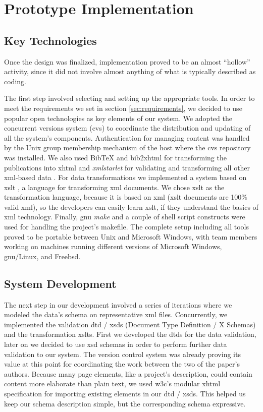 \documentclass{article}
\begin{document}
\section{Prototype Implementation}

\subsection{Key Technologies}
\label{subsec:key-tech}

Once the design was finalized,
implementation proved to be an almost ``hollow'' activity,
since it did not involve almost anything of what
is typically described as coding.

The first step involved selecting and setting up the
appropriate tools. In order to meet the requirements we set in section \ref{sec:requirements}, 
we decided to use popular open
technologies as key elements of our system.
We adopted the concurrent versions system
({\sc cvs}) \cite{BF01} to coordinate the distribution
and updating of all the system's components.
Authentication for managing content was handled by the
Unix group membership mechanism of the host where the
{\sc cvs} repository was installed.
We also used
{\sc BibTeX} \cite{Pa88,Lam94} and {\sc bib2xhtml} \cite{BibXHMTL} for transforming the publications
into {\sc xhtml} and
\textit{xmlstarlet} \cite{Gru04} for validating and transforming
all other {\sc xml}-based data \cite{W3C_XML}.
For data transformations we 
implemented a system based on {\sc xslt} \cite{W3C_XSLT}, a language for transforming {\sc xml} documents.
We chose {\sc xslt} as the transformation language, because it is based on {\sc xml} ({\sc xslt} documents are 100\% valid {\sc xml}), so the
developers can easily learn {\sc xslt}, if they understand the basics of {\sc xml} technology.
Finally, {\sc gnu} {\em make} \cite{gnu_make} and a couple of shell script
constructs were used for handling the project's makefile.
The complete setup including all tools proved to be portable
between Unix and Microsoft Windows, with team members working
on machines running different versions of Microsoft Windows, {\sc gnu}/Linux,
and Free{\sc bsd}.

\subsection{System Development}

The next step in our development involved a series of iterations where we
modeled the data's schema on representative {\sc xml}
files. Concurrently, we implemented the validation {\sc dtd / xsd}s (Document Type Definition / X Schemas)
and the transformation {\sc xslt}s. First we developed the {\sc dtd}s
for the data validation, later on we decided to use {\sc xsd} schemas in order to perform
further data validation to our system.
The version control system was already proving its value
at this point
for coordinating the work between the two of the paper's authors.
Because many page elements, like a project's description,
could contain content more elaborate than plain text,
we used {\sc w3c}'s modular {\sc xhtml} specification for
importing existing elements in our {\sc dtd / xsd}s.
This helped us keep our schema description simple,
but the corresponding schema expressive.
\end{document}
